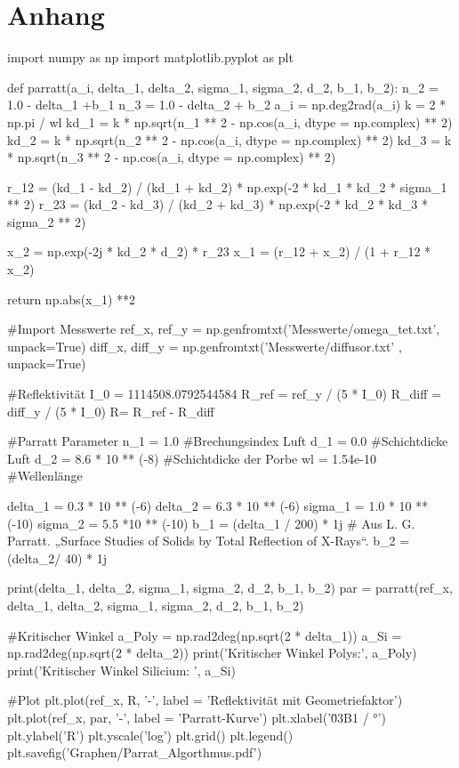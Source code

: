 \section{Anhang}

\begin{python}
    import numpy as np
    import matplotlib.pyplot as plt

    def parratt(a_i, delta_1, delta_2, sigma_1, sigma_2, d_2, b_1, b_2):
        n_2 = 1.0 - delta_1 +b_1
        n_3 = 1.0 - delta_2 + b_2
        a_i = np.deg2rad(a_i)
        k = 2 * np.pi / wl
        kd_1 = k * np.sqrt(n_1 ** 2 - np.cos(a_i, dtype = np.complex) ** 2)
        kd_2 = k * np.sqrt(n_2 ** 2 - np.cos(a_i, dtype = np.complex) ** 2)
        kd_3 = k * np.sqrt(n_3 ** 2 - np.cos(a_i, dtype = np.complex) ** 2)
     
        
        r_12 = (kd_1 - kd_2) / (kd_1 + kd_2) * np.exp(-2 * kd_1 * kd_2 * sigma_1 ** 2)
        r_23 = (kd_2 - kd_3) / (kd_2 + kd_3) * np.exp(-2 * kd_2 * kd_3 * sigma_2 ** 2)

        x_2 = np.exp(-2j * kd_2 * d_2) * r_23
        x_1 = (r_12 + x_2) / (1 + r_12 * x_2)

        return np.abs(x_1) **2

    #Import Messwerte
    ref_x, ref_y = np.genfromtxt('Messwerte/omega_tet.txt', unpack=True)
    diff_x, diff_y = np.genfromtxt('Messwerte/diffusor.txt' , unpack=True)

    #Reflektivität
    I_0 = 1114508.0792544584
    R_ref = ref_y / (5 * I_0)
    R_diff = diff_y / (5 * I_0)
    R= R_ref - R_diff

    #Parratt Parameter
    n_1 = 1.0               #Brechungsindex Luft
    d_1 = 0.0               #Schichtdicke Luft
    d_2 = 8.6 * 10 ** (-8) #Schichtdicke der Porbe
    wl = 1.54e-10           #Wellenlänge

    delta_1 = 0.3 * 10 ** (-6)
    delta_2 = 6.3 * 10 ** (-6)
    sigma_1 = 1.0 * 10 ** (-10) 
    sigma_2 = 5.5 *10 ** (-10)
    b_1 = (delta_1 / 200) * 1j   # Aus L. G. Parratt. „Surface Studies of Solids by Total Reflection of X-Rays“.
    b_2 = (delta_2/ 40) * 1j


    print(delta_1, delta_2, sigma_1, sigma_2, d_2, b_1, b_2)
    par = parratt(ref_x, delta_1, delta_2, sigma_1, sigma_2, d_2, b_1, b_2)


    #Kritischer Winkel
    a_Poly = np.rad2deg(np.sqrt(2 * delta_1))
    a_Si = np.rad2deg(np.sqrt(2 * delta_2))
    print('Kritischer Winkel Polys:', a_Poly)
    print('Kritischer Winkel Silicium: ', a_Si)

    #Plot
    plt.plot(ref_x, R, '-', label = 'Reflektivität mit Geometriefaktor')
    plt.plot(ref_x, par, '-', label = 'Parratt-Kurve')
    plt.xlabel('\u03B1 / °')
    plt.ylabel('R')
    plt.yscale('log')
    plt.grid()
    plt.legend()
    plt.savefig('Graphen/Parrat_Algorthmus.pdf')
\end{python}
